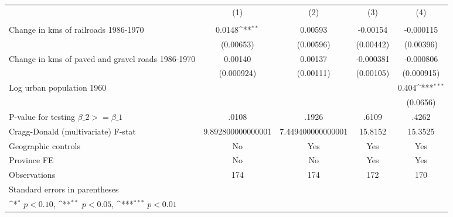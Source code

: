 {
\def\sym#1{\ifmmode^{#1}\else\(^{#1}\)\fi}
\begin{tabular}{l*{4}{c}}
\hline\hline
                &\multicolumn{1}{c}{(1)}&\multicolumn{1}{c}{(2)}&\multicolumn{1}{c}{(3)}&\multicolumn{1}{c}{(4)}\\
                &\multicolumn{1}{c}{}&\multicolumn{1}{c}{}&\multicolumn{1}{c}{}&\multicolumn{1}{c}{}\\
\hline
Change in kms of railroads 1986-1970&   0.0148\sym{**} &  0.00593         & -0.00154         &-0.000115         \\
                &(0.00653)         &(0.00596)         &(0.00442)         &(0.00396)         \\
[1em]
Change in kms of paved and gravel roads 1986-1970&  0.00140         &  0.00137         &-0.000381         &-0.000806         \\
                &(0.000924)         &(0.00111)         &(0.00105)         &(0.000915)         \\
[1em]
Log urban population 1960&                  &                  &                  &    0.404\sym{***}\\
                &                  &                  &                  & (0.0656)         \\
\hline
P-value for testing $\beta\_{2} >= \beta\_{1}$&    .0108         &    .1926         &    .6109         &    .4262         \\
Cragg-Donald (multivariate) F-stat&9.892800000000001         &7.449400000000001         &  15.8152         &  15.3525         \\
Geographic controls&       No         &      Yes         &      Yes         &      Yes         \\
Province FE     &       No         &       No         &      Yes         &      Yes         \\
Observations    &      174         &      174         &      172         &      170         \\
\hline\hline
\multicolumn{5}{l}{\footnotesize Standard errors in parentheses}\\
\multicolumn{5}{l}{\footnotesize \sym{*} \(p<0.10\), \sym{**} \(p<0.05\), \sym{***} \(p<0.01\)}\\
\end{tabular}
}
